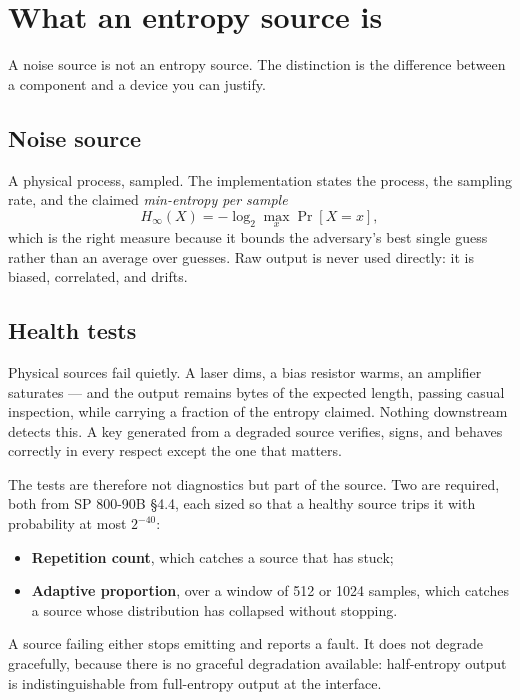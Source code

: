\documentclass[11pt,a4paper]{article}
\begin{document}
\section{What an entropy source is}

A noise source is not an entropy source. The distinction is the difference
between a component and a device you can justify.

\subsection{Noise source}

A physical process, sampled. The implementation states the process, the
sampling rate, and the claimed \emph{min-entropy per sample}
\[
H_\infty(X) = -\log_2 \max_x \Pr[X = x],
\]
which is the right measure because it bounds the adversary's best single guess
rather than an average over guesses. Raw output is never used directly: it is
biased, correlated, and drifts.

\subsection{Health tests}

Physical sources fail quietly. A laser dims, a bias resistor warms, an
amplifier saturates --- and the output remains bytes of the expected length,
passing casual inspection, while carrying a fraction of the entropy claimed.
Nothing downstream detects this. A key generated from a degraded source
verifies, signs, and behaves correctly in every respect except the one that
matters.

The tests are therefore not diagnostics but part of the source. Two are
required, both from SP 800-90B \S4.4, each sized so that a healthy source trips
it with probability at most $2^{-40}$:

\begin{itemize}
\item \textbf{Repetition count}, which catches a source that has stuck;
\item \textbf{Adaptive proportion}, over a window of 512 or 1024 samples, which
catches a source whose distribution has collapsed without stopping.
\end{itemize}

A source failing either stops emitting and reports a fault. It does not degrade
gracefully, because there is no graceful degradation available: half-entropy
output is indistinguishable from full-entropy output at the interface.
\end{document}
